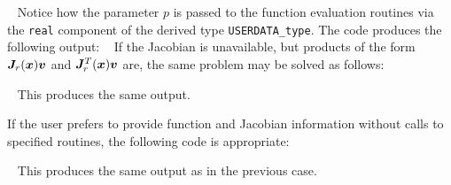 \documentclass{galahad}
\begin{document}
{\tt \small
\VerbatimInput{\packageexample}
}
\noindent
Notice how the parameter $p$ is passed to the function evaluation
routines via the {\tt real} component of the derived type {\tt USERDATA\_type}.
The code produces the following output:
{\tt \small
\VerbatimInput{\packageresults}
}
\noindent
If the Jacobian is unavailable, but products of the form
${\bm{J}}_r({\bm{x}}) {\bm{v}}$ and ${\bm{J}}_r^T({\bm{x}}) {\bm{v}}$ 
are, the same problem may be solved as follows:

{\tt \small
\VerbatimInput{\packageexampleb}
}
\noindent
This produces the same output.

If the user prefers to provide function and Jacobian information
without calls to specified routines, the following code is appropriate:

{\tt \small
\VerbatimInput{\packageexamplec}
}
\noindent
This produces the same output as in the previous case.
\noindent
\end{document}
